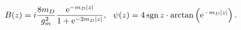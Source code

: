 \begin{equation}
\label{solution}
B(z)=i\frac{8m_D}{g_m^2}\frac{{\rm e}^{-m_D|z|}}{1+{\rm e}^{-2m_D|z|}},~~
\psi(z)=4{\,}{\rm sgn}{\,}z\cdot\arctan\left({\rm e}^{-m_D|z|}\right).
\end{equation}

